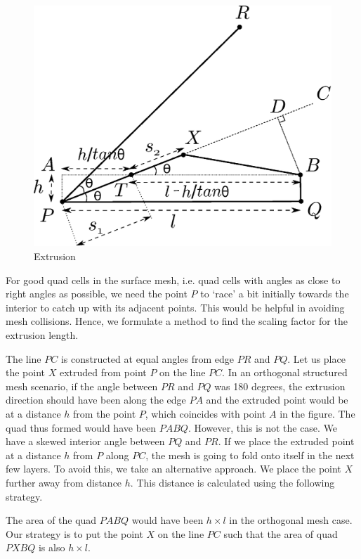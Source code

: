 \begin{figure}[hbt!]
    \centering
    \includegraphics[width=.6\linewidth]{img/m1/extrusionScaling/extrusionScaling.eps}
    \caption{Extrusion }
    \label{fig:basic-diagram-extrusion-factor}
\end{figure}

For good quad cells in the surface mesh, i.e. quad cells with angles as close to right angles as possible, we need the point $P$ to `race' a bit initially towards the interior to catch up with its adjacent points. This would be helpful in avoiding mesh collisions. Hence, we formulate a method to find the scaling factor for the extrusion length.

The line $\mathit{PC}$ is constructed at equal angles from edge $\mathit{PR}$ and $\mathit{PQ}$. Let us place the point $\mathit{X}$ extruded from point $P$ on the line $\mathit{PC}$. In an orthogonal structured mesh scenario, if the angle between $\mathit{PR}$ and $\mathit{PQ}$ was 180 degrees, the extrusion direction should have been along the edge $\mathit{PA}$ and the extruded point would be at a distance $\mathit{h}$ from the point $\mathit{P}$, which coincides with point $\mathit{A}$ in the figure. The quad thus formed would have been $\mathit{PABQ}$. However, this is not the case. We have a skewed interior angle between $\mathit{PQ}$ and $\mathit{PR}$. If we place the extruded point at a distance $\mathit{h}$ from $\mathit{P}$ along $\mathit{PC}$, the mesh is going to fold onto itself in the next few layers. To avoid this, we take an alternative approach. We place the point $\mathit{X}$ further away from distance $\mathit{h}$. This distance is calculated using the following strategy.

The area of the quad $\mathit{PABQ}$ would have been $h\times l$ in the orthogonal mesh case. Our strategy is to put the point $\mathit{X}$ on the line $\mathit{PC}$ such that the area of quad $\mathit{PXBQ}$ is also $\mathit{h\times l}$.

